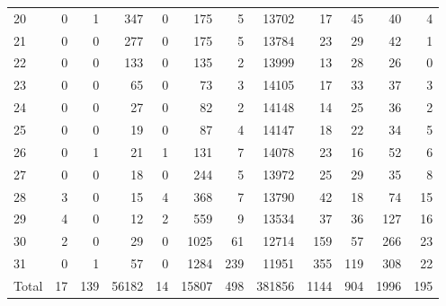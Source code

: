 \begin{table}
\begin{tabular}{lrrrrrrrrrrr}
20 & 0 & 1 & 347 & 0 & 175 & 5 & 13702 & 17 & 45 & 40 & 4 \\
21 & 0 & 0 & 277 & 0 & 175 & 5 & 13784 & 23 & 29 & 42 & 1 \\
22 & 0 & 0 & 133 & 0 & 135 & 2 & 13999 & 13 & 28 & 26 & 0 \\
23 & 0 & 0 & 65 & 0 & 73 & 3 & 14105 & 17 & 33 & 37 & 3 \\
24 & 0 & 0 & 27 & 0 & 82 & 2 & 14148 & 14 & 25 & 36 & 2 \\
25 & 0 & 0 & 19 & 0 & 87 & 4 & 14147 & 18 & 22 & 34 & 5 \\
26 & 0 & 1 & 21 & 1 & 131 & 7 & 14078 & 23 & 16 & 52 & 6 \\
27 & 0 & 0 & 18 & 0 & 244 & 5 & 13972 & 25 & 29 & 35 & 8 \\
28 & 3 & 0 & 15 & 4 & 368 & 7 & 13790 & 42 & 18 & 74 & 15 \\
29 & 4 & 0 & 12 & 2 & 559 & 9 & 13534 & 37 & 36 & 127 & 16 \\
30 & 2 & 0 & 29 & 0 & 1025 & 61 & 12714 & 159 & 57 & 266 & 23 \\
31 & 0 & 1 & 57 & 0 & 1284 & 239 & 11951 & 355 & 119 & 308 & 22 \\
Total & 17 & 139 & 56182 & 14 & 15807 & 498 & 381856 & 1144 & 904 & 1996 & 195 \\
\end{tabular}
\end{table}
